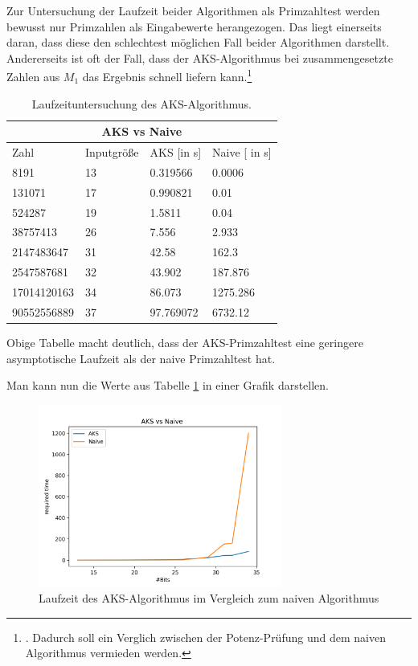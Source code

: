 \documentclass[12pt,oneside]{article}
\theoremstyle{remark}
\theoremstyle{definition}
\begin{document}
Zur Untersuchung der Laufzeit beider Algorithmen als Primzahltest werden bewusst nur Primzahlen als Eingabewerte herangezogen. Das liegt einerseits daran, dass diese den schlechtest möglichen Fall beider Algorithmen darstellt. Andererseits ist oft der Fall, dass der AKS-Algorithmus bei zusammengesetzte Zahlen aus $M_1$ das Ergebnis  schnell liefern kann.\newline\footnote{. Dadurch soll ein Verglich zwischen der Potenz-Prüfung und dem naiven Algorithmus vermieden werden.}

\begin{table}[h!]
\centering
\begin{tabular}{ |p{3cm}||p{3cm}|p{3cm}|p{3cm}|  }
 \hline
 \multicolumn{4}{|c|}{AKS vs Naive} \\
 \hline
 Zahl & Inputgröße  & AKS [in s] &Naive [ in s]\\
 \hline
 8191   & 13    &0.319566&   0.0006\\
 131071&   17  & 0.990821   &0.01\\
 524287 &19 &  1.5811& 0.04\\
 38757413    &26 & 7.556&   2.933\\
 2147483647& 31  & 42.58   &162.3\\
 2547587681& 32  &  43.902&  187.876\\
 17014120163&   34  & 86.073& 1275.286\\
 90552556889&   37  & 97.769072& 6732.12\\

 \hline
\end{tabular}
 \caption{Laufzeituntersuchung des AKS-Algorithmus.}
\label{table:4}
\end{table}

Obige Tabelle macht deutlich, dass der AKS-Primzahltest eine geringere asymptotische Laufzeit als der naive Primzahltest hat.

Man kann nun die Werte aus Tabelle \ref{table:4} in einer Grafik darstellen. 

\begin{figure}[h]
\includegraphics[width=8cm]{plots/aksVsNaive.png}
\centering
\caption{Laufzeit des AKS-Algorithmus im Vergleich zum naiven Algorithmus}
\label{plot_aks_naive}
\end{figure}
\end{document}
